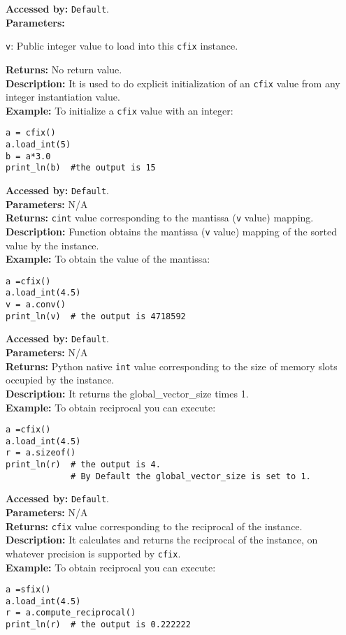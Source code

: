 			\textbf{Accessed by:} \verb|Default|.		 \\
			\textbf{Parameters:}
			\begin{description}
				\item \verb|v|: Public integer value to load into this \verb|cfix| instance.
			\end{description}
			\textbf{Returns:} No return value. \\
			\textbf{Description:}
				 It is used to do explicit initialization of an \verb|cfix| value from any integer instantiation value. \\
	     	\textbf{Example:}
    		    To initialize a \verb|cfix| value with an integer:
\begin{lstlisting}
a = cfix()
a.load_int(5)
b = a*3.0
print_ln(b)  #the output is 15   	
\end{lstlisting}	 
			\textbf{Accessed by:} \verb|Default|.		 \\
			\textbf{Parameters:} N/A \\
			\textbf{Returns:} \verb|cint| value corresponding to the mantissa (\verb|v| value) mapping. \\
			\textbf{Description:}
				Function obtains the mantissa (\verb|v| value) mapping of the sorted value by the instance. \\
	     	\textbf{Example:}
    		    To obtain the value of the mantissa:
\begin{lstlisting}
a =cfix()
a.load_int(4.5)
v = a.conv()
print_ln(v)  # the output is 4718592   	
\end{lstlisting}	 
		
		
			\textbf{Accessed by:} \verb|Default|.		 \\
			\textbf{Parameters:} N/A \\
			\textbf{Returns:}
				 Python native \verb|int| value corresponding to the size of memory slots occupied by the instance. \\
			\textbf{Description:}
				It returns the global_vector_size times 1. \\
	     	\textbf{Example:}
    		    To obtain reciprocal you can execute:
\begin{lstlisting}
a =cfix()
a.load_int(4.5)
r = a.sizeof()
print_ln(r)  # the output is 4. 
			 # By Default the global_vector_size is set to 1.    	
\end{lstlisting}	 
			\textbf{Accessed by:} \verb|Default|.		 \\
			\textbf{Parameters:} N/A \\
			\textbf{Returns:} \verb|cfix| value corresponding to the reciprocal of the instance. \\
			\textbf{Description:}
				It calculates and returns the reciprocal of the instance, on whatever precision is supported by \verb|cfix|.\\
	     	\textbf{Example:}
    		    To obtain reciprocal you can execute:
\begin{lstlisting}
a =sfix()
a.load_int(4.5)
r = a.compute_reciprocal()
print_ln(r)  # the output is 0.222222   	
\end{lstlisting}	 

